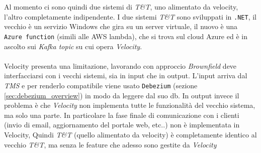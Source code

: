 Al momento ci sono quindi due sistemi di \textit{T\&T}, uno alimentato da velocity, l'altro completamente indipendente.
I due sistemi \textit{T\&T} sono sviluppati in \texttt{.NET}, il vecchio è un servizio Windows che gira su un server virtuale, 
il nuovo è una \texttt{Azure function} (simili alle AWS lambda), che si trova sul cloud Azure ed è in ascolto sui \textit{Kafka topic} su cui opera \textit{Velocity}.
\\\\
Velocity presenta una limitazione, lavorando con approccio \textit{Brownfield} deve interfacciarsi con i vecchi sistemi, sia in input che in output.
L'input arriva dal \textit{TMS} e per renderlo compatibile viene usato \texttt{Debezium} (sezione \ref*{sec:debezium_overview}) in modo da leggere dal suo db.
In output invece il problema è che \textit{Velocity} non implementa tutte le funzionalità del vecchio sistema, ma solo una parte.
In particolare la fase finale di comunicazione con i clienti (invio di email, aggiornamento del portale web, etc..) non è implementata in Velocity,
Quindi \textit{T\&T} (quello alimentato da velocity) è completamente identico al vecchio \textit{T\&T}, ma senza le feature che adesso sono gestite da \textit{Velocity}

